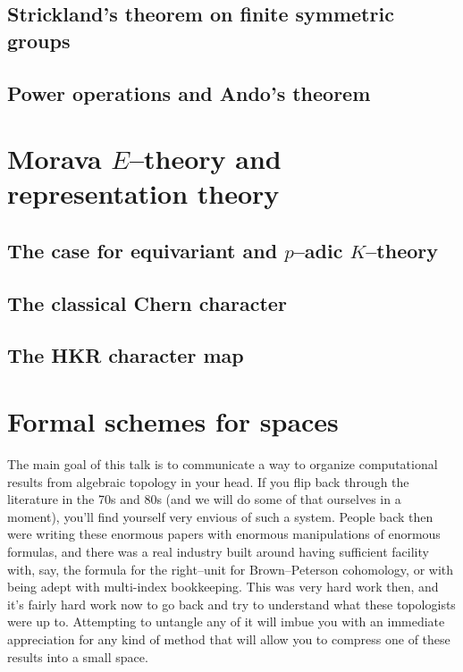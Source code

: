 \documentclass{amsart}
\newcommand{\<}{\langle}
\renewcommand{\>}{\rangle}
\theoremstyle{plain}
\theoremstyle{definition}
\theoremstyle{remark}
\begin{document}
    \subsection{Strickland's theorem on finite symmetric groups}
    \subsection{Power operations and Ando's theorem}

\section{Morava $E$--theory and representation theory}
    \subsection{The case for equivariant and $p$--adic $K$--theory}
    \subsection{The classical Chern character}
    \subsection{The HKR character map}


\newpage

\section{Formal schemes for spaces}

The main goal of this talk is to communicate a way to organize computational results from algebraic topology in your head.  If you flip back through the literature in the 70s and 80s (and we will do some of that ourselves in a moment), you'll find yourself very envious of such a system.  People back then were writing these enormous papers with enormous manipulations of enormous formulas, and there was a real industry built around having sufficient facility with, say, the formula for the right--unit for Brown--Peterson cohomology, or with being adept with multi-index bookkeeping.  This was very hard work then, and it's fairly hard work now to go back and try to understand what these topologists were up to.  Attempting to untangle any of it will imbue you with an immediate appreciation for any kind of method that will allow you to compress one of these results into a small space.
\end{document}
